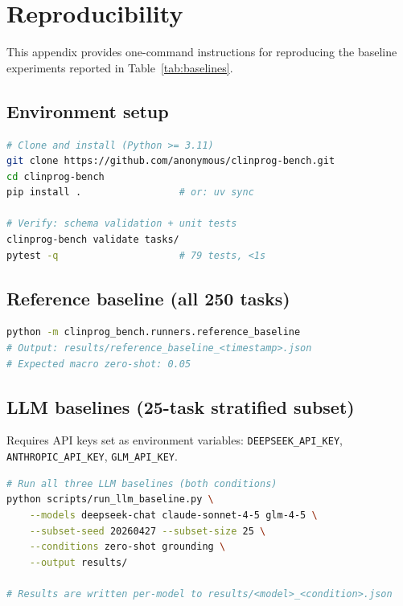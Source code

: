 \section{Reproducibility}
\label{sec:reproducibility}

This appendix provides one-command instructions for reproducing the
baseline experiments reported in Table~\ref{tab:baselines}.

\subsection{Environment setup}

\begin{lstlisting}[language=bash, basicstyle=\ttfamily\small]
# Clone and install (Python >= 3.11)
git clone https://github.com/anonymous/clinprog-bench.git
cd clinprog-bench
pip install .                 # or: uv sync

# Verify: schema validation + unit tests
clinprog-bench validate tasks/
pytest -q                     # 79 tests, <1s
\end{lstlisting}

\subsection{Reference baseline (all 250 tasks)}

\begin{lstlisting}[language=bash, basicstyle=\ttfamily\small]
python -m clinprog_bench.runners.reference_baseline
# Output: results/reference_baseline_<timestamp>.json
# Expected macro zero-shot: 0.05
\end{lstlisting}

\subsection{LLM baselines (25-task stratified subset)}

Requires API keys set as environment variables:
\texttt{DEEPSEEK\_API\_KEY}, \texttt{ANTHROPIC\_API\_KEY},
\texttt{GLM\_API\_KEY}.

\begin{lstlisting}[language=bash, basicstyle=\ttfamily\small]
# Run all three LLM baselines (both conditions)
python scripts/run_llm_baseline.py \
    --models deepseek-chat claude-sonnet-4-5 glm-4-5 \
    --subset-seed 20260427 --subset-size 25 \
    --conditions zero-shot grounding \
    --output results/

# Results are written per-model to results/<model>_<condition>.json
\end{lstlisting}

